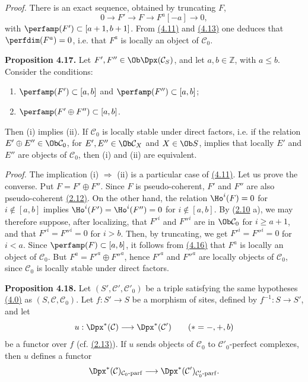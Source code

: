 \emph{Proof.} There is an exact sequence, obtained by truncating \(F\),
\[
  0\longrightarrow F'\longrightarrow F\longrightarrow F^a[-a]\longrightarrow 0,
\]
with \(\perfamp(F')\subset[a+1,b+1]\). From \hyperlink{sga6.e01.complement.4-11}{(4.11)} and \hyperlink{sga6.e01.lem.4-13}{(4.13)} one deduces that \(\perfdim(F^a)=0\), i.e. that \(F^a\) is locally an object of \(\mathcal C_0\).

\textbf{Proposition 4.17.} Let \(F',F''\in\Ob\Dpx(\mathcal C_S)\), and let \(a,b\in\mathbb Z\), with \(a\leq b\). Consider the conditions:
\begin{enumerate}[label=(\roman*)]
\item \(\perfamp(F')\subset[a,b]\) and \(\perfamp(F'')\subset[a,b]\);
\item \(\perfamp(F'\oplus F'')\subset[a,b]\).
\end{enumerate}
Then (i) implies (ii). If \(\mathcal C_0\) is locally stable under direct factors, i.e. if the relation \(E'\oplus E''\in\Ob\mathcal C_0\), for \(E',E''\in\Ob\mathcal C_X\) and \(X\in\Ob S\), implies that locally \(E'\) and \(E''\) are objects of \(\mathcal C_0\), then (i) and (ii) are equivalent.

\emph{Proof.} The implication (i) \(\Rightarrow\) (ii) is a particular case of \hyperlink{sga6.e01.complement.4-11}{(4.11)}. Let us prove the converse. Put \(F=F'\oplus F''\). Since \(F\) is pseudo-coherent, \(F'\) and \(F''\) are also pseudo-coherent \hyperlink{sga6.e01.prop.2-12}{(2.12)}. On the other hand, the relation \(\Ho^i(F)=0\) for \(i\notin[a,b]\) implies \(\Ho^i(F')=\Ho^i(F'')=0\) for \(i\notin[a,b]\). By (\hyperlink{sga6.e01.prop.2-10}{2.10} a), we may therefore suppose, after localizing, that \(F'^i\) and \(F''^i\) are in \(\Ob\mathcal C_0\) for \(i\geq a+1\), and that \(F'^i=F''^i=0\) for \(i>b\). Then, by truncating, we get \(F'^i=F''^i=0\) for \(i<a\). Since \(\perfamp(F)\subset[a,b]\), it follows from \hyperlink{sga6.e01.lem.4-16}{(4.16)} that \(F^a\) is locally an object of \(\mathcal C_0\). But \(F^a=F'^a\oplus F''^a\), hence \(F'^a\) and \(F''^a\) are locally objects of \(\mathcal C_0\), since \(\mathcal C_0\) is locally stable under direct factors.

\textbf{Proposition 4.18.} Let \((S',\mathcal C',\mathcal C'_0)\) be a triple satisfying the same hypotheses \hyperlink{sga6.e01.para.4-0}{(4.0)} as \((S,\mathcal C,\mathcal C_0)\). Let \(f:S'\to S\) be a morphism of sites, defined by \(f^{-1}:S\to S'\), and let
\[
  u:\Dpx^*(\mathcal C)\longrightarrow \Dpx^*(\mathcal C')\qquad (*=-,+,b)
\]
be a functor over \(f\) (cf. \hyperlink{sga6.e01.prop.2-13}{(2.13)}). If \(u\) sends objects of \(\mathcal C_0\) to \(\mathcal C'_0\)-perfect complexes, then \(u\) defines a functor
\[
  \Dpx^*(\mathcal C)_{\mathcal C_0\text{-}\mathrm{parf}}
  \longrightarrow
  \Dpx^*(\mathcal C')_{\mathcal C'_0\text{-}\mathrm{parf}}.
\]

